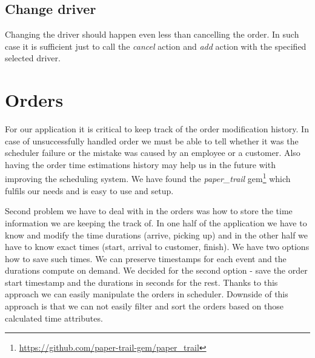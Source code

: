\subsection{Change driver}
Changing the driver should happen even less than cancelling the order. In such case it is sufficient just to call the \textit{cancel} action and \textit{add} action with the specified selected driver.
	 
	 
	 
\section {Orders}

	For our application it is critical to keep track of the order modification history. In case of unsuccessfully handled order we must be able to tell whether it was the scheduler failure or the mistake was caused by an employee or a customer. Also having the order time estimations history may help us in the future with improving the scheduling system. We have found the \textit{paper\_trail} gem\footnote{\url{https://github.com/paper-trail-gem/paper_trail}} which fulfils our needs and is easy to use and setup.
	
	
	Second problem we have to deal with in the orders was how to store the time information we are keeping the track of. In one half of the application we have to know and modify the time durations (arrive, picking up) and in the other half we have to know exact times (start, arrival to customer, finish). We have two options how to save such times. We can preserve timestamps for each event and the durations compute on demand. We decided for the second option - save the order start timestamp and the durations in seconds for the rest. Thanks to this approach we can easily manipulate the orders in scheduler.  Downside of this approach is that we can not easily filter and sort the orders based on those calculated time attributes.   
